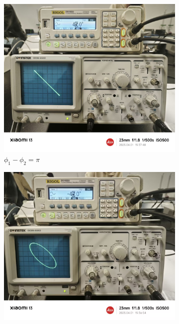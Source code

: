 \documentclass[12pt,a4paper]{article}
\begin{document}
\begin{figure}[H]
		\vspace{1em}
		
		\begin{subfigure}[b]{0.23\textwidth}
			\centering
			\includegraphics[width=\textwidth]{180.jpg}
			\caption{$\phi_1-\phi_2=\pi$}
			\label{fig:subpi}
		\end{subfigure}
		\hfill
		\begin{subfigure}[b]{0.23\textwidth}
			\centering
			\includegraphics[width=\textwidth]{225.jpg}

\end{subfigure}
\end{figure}
\end{document}
